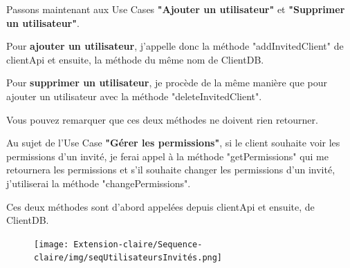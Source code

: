\begin{flushleft}
Passons maintenant aux Use Cases \textbf{"Ajouter un utilisateur"} et \textbf{"Supprimer un utilisateur"}.
\end{flushleft}

\begin{flushleft}
Pour \textbf{ajouter un utilisateur}, j'appelle donc la méthode "addInvitedClient" de clientApi et ensuite, la méthode du même nom de ClientDB.
\end{flushleft}

\begin{flushleft}
Pour \textbf{supprimer un utilisateur}, je procède de la même manière que pour ajouter un utilisateur avec la méthode "deleteInvitedClient".
\end{flushleft}

\begin{flushleft}
Vous pouvez remarquer que ces deux méthodes ne doivent rien retourner.
\end{flushleft}

\begin{flushleft}
Au sujet de l'Use Case \textbf{"Gérer les permissions"}, si le client souhaite voir les permissions d'un invité, je ferai appel à la méthode "getPermissions" qui me retournera les permissions et s'il souhaite changer les permissions d'un invité, j'utiliserai la méthode "changePermissions".
\end{flushleft}

\begin{flushleft}
Ces deux méthodes sont d'abord appelées depuis clientApi et ensuite, de ClientDB.
\end{flushleft}

\newpage
\begin{figure}[h]
\centering
\texttt{[image: Extension-claire/Sequence-claire/img/seqUtilisateursInvités.png]}
\end{figure}
